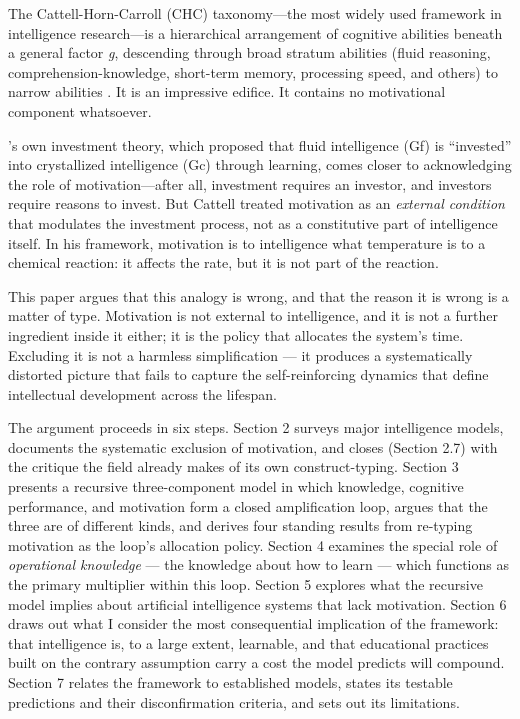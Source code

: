 \documentclass[12pt,a4paper]{article}
\begin{document}
The Cattell-Horn-Carroll (CHC) taxonomy---\hspace{0pt}the most widely used framework in intelligence research---\hspace{0pt}is a hierarchical arrangement of cognitive abilities beneath a general factor \emph{g}, descending through broad stratum abilities (fluid reasoning, comprehension-knowledge, short-term memory, processing speed, and others) to narrow abilities \citep{McGrew2009,SchneiderMcGrew2018}. It is an impressive edifice. It contains no motivational component whatsoever.

\citeauthor{Cattell1971}'s \citeyearpar{Cattell1971} own investment theory, which proposed that fluid intelligence (Gf) is ``invested'' into crystallized intelligence (Gc) through learning, comes closer to acknowledging the role of motivation---\hspace{0pt}after all, investment requires an investor, and investors require reasons to invest. But Cattell treated motivation as an \emph{external condition} that modulates the investment process, not as a constitutive part of intelligence itself. In his framework, motivation is to intelligence what temperature is to a chemical reaction: it affects the rate, but it is not part of the reaction.

This paper argues that this analogy is wrong, and that the reason it is wrong is a matter of type. Motivation is not external to intelligence, and it is not a further ingredient inside it either; it is the policy that allocates the system's time. Excluding it is not a harmless simplification ---\hspace{0pt} it produces a systematically distorted picture that fails to capture the self-reinforcing dynamics that define intellectual development across the lifespan.

The argument proceeds in six steps. Section 2 surveys major intelligence models, documents the systematic exclusion of motivation, and closes (Section 2.7) with the critique the field already makes of its own construct-typing. Section 3 presents a recursive three-component model in which knowledge, cognitive performance, and motivation form a closed amplification loop, argues that the three are of different kinds, and derives four standing results from re-typing motivation as the loop's allocation policy. Section 4 examines the special role of \emph{operational knowledge} ---\hspace{0pt} the knowledge about how to learn ---\hspace{0pt} which functions as the primary multiplier within this loop. Section 5 explores what the recursive model implies about artificial intelligence systems that lack motivation. Section 6 draws out what I consider the most consequential implication of the framework: that intelligence is, to a large extent, learnable, and that educational practices built on the contrary assumption carry a cost the model predicts will compound. Section 7 relates the framework to established models, states its testable predictions and their disconfirmation criteria, and sets out its limitations.
\end{document}
